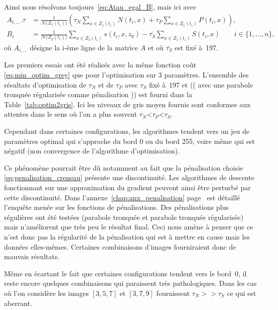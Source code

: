 \documentclass[main.tex]{subfiles}
\begin{document}
Ainsi nous résolvons toujours~\eqref{eq:Atau_egal_B}, mais ici avec
\begin{equation}
\label{eq:corresp_A_integ}
\begin{aligned}
A_{i,...}.\tau & = \frac{1}{\mathcal{N}\big(Z_1(t_i)\big)}\left( \tau_N\!\!\sum_{x\in Z_1(t_i)}\!\!N(t_i,x) + \tau_P\!\!\sum_{x\in Z_1(t_i)}\!\!P(t_i,x) \right), \\
B_i &= \frac{1}{\mathcal{N}\big(Z_2(t_i)\big)} \sum_{x\in Z_2(t_i)}\!\! s(t_i,x,z_0) - \bar{\tau_S}\!\!\sum_{x\in Z_1(t_i)}\!\!S(t_i,x) \qquad i \in \{1,...,n\},
\end{aligned}
\end{equation}
où $A_{i,...}$ désigne la i-ème ligne de la matrice $A$ et où $\bar{\tau_S}$ est fixé à~197.


Les premiers essais ont été réalisés avec la même fonction coût \eqref{eq:min_optim_grey} que pour l'optimisation sur 3 paramètres. 
L'ensemble des résultats d'optimisation de $\tau_N$ et de $\tau_P$ avec $\tau_S$ fixé à~197 et (( avec une parabole tronquée régularisée comme pénalisation )) est fourni dans la Table~\ref{tab:optim2gris}. Ici les niveaux de gris moyen fournis sont conformes aux attentes dans le sens où l'on a plus souvent  $\tau_N$<$\tau_P$<$\tau_S$.

Cependant dans certaines configurations, les algorithmes tendent vers un jeu de paramètres optimal qui s'approche du bord 0 ou du bord 255, voire même qui est négatif (\ie non convergence de l'algorithme d'optimisation). 


Ce phénomène pourrait être dû notamment au fait que la pénalisation choisie \eqref{eq:penalisation_creneau} présente une discontinuité. Les algorithmes de descente fonctionnant sur une approximation du gradient peuvent ainsi être perturbé par cette discontinuité. Dans l'annexe~\ref{chap:anx_penalisation} page~\pageref{chap:anx_penalisation} est détaillé l'enquête menée sur les fonctions de pénalisations. Des pénalisations plus régulières ont été testées (parabole tronquée et parabole tronquée régularisée) mais n'améliorent que très peu le résultat final. Ceci nous amène à penser que ce n'est donc pas la régularité de la pénalisation qui est à mettre en cause mais les données elles-mêmes. Certaines combinaisons d'images fourniraient donc de mauvais résultats. 



Même en écartant le fait que certaines configurations tendent vers le bord~0, il reste encore quelques combinaisons qui paraissent très pathologiques. Dans les cas où l'on considère les images $[3,5,7]$ et $[3,7,9]$ fournissent $\tau_N >> \tau_S$ ce qui est aberrant. 
\end{document}
